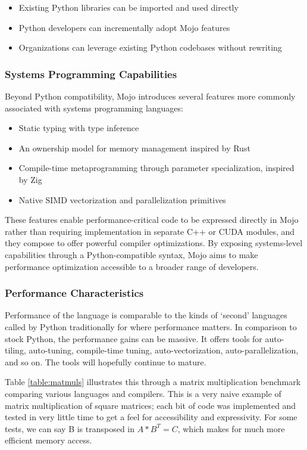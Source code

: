 \documentclass[manuscript,screen,review,format=acmsmall]{acmart}
\begin{document}
\begin{itemize}
    \item Existing Python libraries can be imported and used directly
    \item Python developers can incrementally adopt Mojo features
    \item Organizations can leverage existing Python codebases without rewriting
\end{itemize}

\subsubsection{Systems Programming Capabilities}

Beyond Python compatibility, Mojo introduces several features more commonly associated with systems programming languages:

\begin{itemize}
    \item Static typing with type inference
    \item An ownership model for memory management inspired by Rust
    \item Compile-time metaprogramming through parameter specialization, inspired by Zig
    \item Native SIMD vectorization and parallelization primitives
\end{itemize}

These features enable performance-critical code to be expressed directly in Mojo rather than requiring implementation in separate C++ or CUDA modules, and they compose to offer powerful compiler optimizations. By exposing systems-level capabilities through a Python-compatible syntax, Mojo aims to make performance optimization accessible to a broader range of developers.

\subsubsection{Performance Characteristics}

Performance of the language is comparable to the kinds of ‘second’ languages called by Python traditionally for where performance matters. In comparison to stock Python, the performance gains can be massive. It offers tools for auto-tiling, auto-tuning, compile-time tuning, auto-vectorization, auto-parallelization, and so on. The tools will hopefully continue to mature.

Table \ref{table:matmuls} illustrates this through a matrix multiplication benchmark comparing various languages and compilers. This is a very naive example of matrix multiplication of square matrices; each bit of code was implemented and tested in very little time to get a feel for accessibility and expressivity. For some tests, we can say B is transposed in $A * B^T = C$, which makes for much more efficient memory access.
\end{document}
